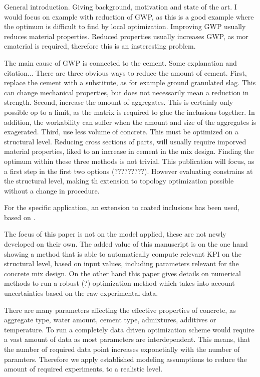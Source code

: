 
General introduction.
Giving background, motivation and state of the art.
I would focus on example with reduction of GWP, as this is a good example where the optimum is difficult to find by local optimization.
Improving GWP usually reduces material properties.
Reduced properties usually increases GWP, as mor ematerial is required, therefore this is an insteresting problem.

The main cause of GWP is connected to the cement.
Some explanation and citation...
There are three obvious ways to reduce the amount of cement.
First, replace the cement with a substitute, as for example ground granulated slag.
This can change mechanical properties, but does not necessarily mean a reduction in strength.
Second, increase the amount of aggregates.
This is certainly only possible op to a limit, as the matrix is required to glue the inclusions together.
In addition, the workability can suffer when the amount and size of the aggregates is exagerated.
Third, use less volume of concrete.
This must be optimized on a structural level.
Reducing cross sections of parts, will usually require imporved material properties, liked to an increase in cement in the mix design.
Finding the optimum within these three methods is not trivial.
This publication will focus, as a first step in the first two options (?????????).
However evaluating constrains at the structural level, making th extension to topology optimization possible without a change in procedure.


For the specific application, an extension to coated inclusions has been used, based on \cite{her_1993_nlib}.



The focus of this paper is not on the model applied, these are not newly developed on their own.
The added value of this manuscript is on the one hand showing a method that is able to automatically compute relevant KPI on the structural level, based on input values, including parameters relevant for the concrete mix design.
On the other hand this paper gives details on numerical methods to run a robust (?) optimization method which takes into account uncertainties based on the raw experimental data.

There are many parameters affecting the effective properties of concrete, as aggregate type, water amount, cement type, admixtures, additives or temperature.
To run a completely data driven optimization scheme would require a vast amount of data as most parameters are interdependent.
This means, that the number of required data point increases exponetially with the number of paramters.
Therefore we apply established modeling assumptions to reduce the amount of required experiments, to a realistic level.







